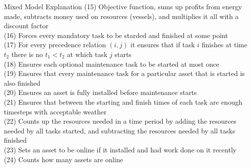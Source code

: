 \documentclass{beamer}
\begin{document}
\begin{frame}{Mixed Model Explanation}
\footnotesize
(15) Objective function, sums up profits from energy made, subtracts money used on resources (vessels), and multiplies it all with a discount factor	\\
(16) Forces every mandatory task to be starded and finished at some point	\\
(17) For every precedence relation $(i, j)$ it ensures that if task $i$ finishes at time $t_2$ there is no $t_1 < t_2$ at which task $j$ starts 	\\
(18) Ensures each optional maintenance task to be started at most once 	\\
(19) Ensures that every maintenance task for a particular asset that is started is also finished \\
(20) Ensures an asset is fully installed before maintenance starts	\\
(21) Ensures that between the starting and finish times of each task are enough timesteps with acceptable weather	\\
(22) Counts up the resources needed in a time period by adding the resources needed by all tasks started, and subtracting the resources needed by all tasks finished	\\
(23) Sets an asset to be online if it installed and had work done on it recently \\
(24) Counts how many assets are online	
\end{frame}
\end{document}
